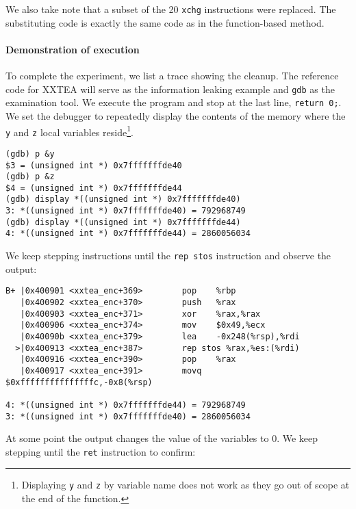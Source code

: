 \documentclass[a4paper,10pt,openright]{memoir}
\newcommand{\code}[1]{\texttt{#1}}
\begin{document}
We also take note that a subset of the 20 \code{xchg} instructions were 
replaced. The substituting code is exactly the same code as in the 
function-based method.

\paragraph{Demonstration of execution}

To complete the experiment, we list a trace showing the cleanup. The 
reference code for XXTEA will serve as the information leaking example 
and \code{gdb} as the examination tool. We execute the program and stop 
at the last line, \code{return 0;}. We set the debugger to repeatedly 
display the contents of the memory where the \code{y} and \code{z} 
local variables reside\footnote{Displaying \code{y} and \code{z} by 
variable name does not work as they go out of scope at the end of the 
function.}.

\begin{verbatim}
(gdb) p &y
$3 = (unsigned int *) 0x7fffffffde40
(gdb) p &z
$4 = (unsigned int *) 0x7fffffffde44
(gdb) display *((unsigned int *) 0x7fffffffde40)
3: *((unsigned int *) 0x7fffffffde40) = 792968749
(gdb) display *((unsigned int *) 0x7fffffffde44)
4: *((unsigned int *) 0x7fffffffde44) = 2860056034
\end{verbatim}

We keep stepping instructions until the \code{rep stos} instruction and 
observe the output:

\begin{verbatim}
B+ |0x400901 <xxtea_enc+369>        pop    %rbp                          
   |0x400902 <xxtea_enc+370>        push   %rax                          
   |0x400903 <xxtea_enc+371>        xor    %rax,%rax                     
   |0x400906 <xxtea_enc+374>        mov    $0x49,%ecx                    
   |0x40090b <xxtea_enc+379>        lea    -0x248(%rsp),%rdi             
  >|0x400913 <xxtea_enc+387>        rep stos %rax,%es:(%rdi)             
   |0x400916 <xxtea_enc+390>        pop    %rax                          
   |0x400917 <xxtea_enc+391>        movq   $0xfffffffffffffffc,-0x8(%rsp)

4: *((unsigned int *) 0x7fffffffde44) = 792968749
3: *((unsigned int *) 0x7fffffffde40) = 2860056034
\end{verbatim}

At some point the output changes the value of the variables to 0. We 
keep stepping until the \code{ret} instruction to confirm:
\end{document}
